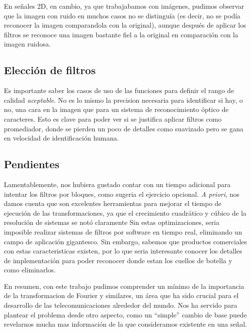 En se\~nales 2D, en cambio, ya que trabajabamos con im\'agenes, pudimos observar que la imagen con ruido en muchos
casos no se distingu\'ia (es decir, no se pod\'ia reconocer la imagen comparandola con la original), aunque despu\'es
de aplicar los filtros se reconoce una imagen bastante fiel a la original en comparaci\'on con la imagen ruidosa.

\subsection{Elecci\'on de filtros}

Es importante saber los casos de uso de las funciones para definir el rango de calidad \textit{aceptable}. No es lo mismo
la precision necesaria para identificar si hay, o no, una cara en la imagen que para un sistema de reconocimiento \'optico
de caracteres. Esto es clave para poder ver si se justifica aplicar filtros como promediador, donde se pierden un poco de detalles como suavizado
pero se gana en velocidad de identificaci\'on humana.

\subsection{Pendientes}

Lamentablemente, nos hubiera gustado contar con un tiempo adicional para intentar los filtros por bloques, como sugeria el ejercicio
opcional. \textit{A priori}, nos damos cuenta que son excelentes herramientas para mejorar el tiempo de ejecuci\'on
de las transformaciones, ya que el crecimiento cuadr\'atico y c\'ubico de la resoluci\'on de sistemas se not\'o claramente
Sin estas optimizaciones, seria imposible realizar sistemas de filtros por software en tiempo real, eliminando un campo de 
aplicaci\'on gigantesco. Sin embargo, sabemos que productos comerciales con estas caracteristicas existen, por lo que
seria interesante conocer los detalles de implementaci\'on para poder reconocer donde estan los cuellos de botella y como
eliminarlos.

En resumen, con este trabajo pudimos comprender un m\'inimo de la importancia de la transformacion de Fourier y similares,
un \'area que ha sido crucial para el desarrollo de las telecomunicaciones alrededor del mundo. Nos ha servido para plantear
el problema desde otro aspecto, como un ``simple'' cambio de base puede revelarnos mucha mas informaci\'on de la que 
consideramos existente en una se\~nal. 

